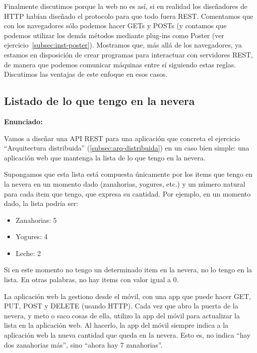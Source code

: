 Finalmente discutimos porque la web no es así, si en realidad los diseñadores de HTTP habían diseñado el protocolo para que todo fuera REST. Comentamos que con los navegadores sólo podemos hacer GETs y POSTs (y contamos que podemos utilizar los demás métodos mediante plug-ins como Poster (ver ejercicio~\ref{subsec:inst-poster}). Mostramos que, más allá de los navegadores, ya estamos en disposición de crear programas para interactuar con servidores REST, de manera que podemos comunicar máquinas entre sí siguiendo estas reglas. Discutimos las ventajas de este enfoque en esos casos.

\subsection{Listado de lo que tengo en la nevera}
\label{subsec:contenido-nevera}

\textbf{Enunciado:}

Vamos a diseñar una API REST para una aplicación que concreta el ejercicio ``Arquitectura distribuida'' (\ref{subsec:arq-distribuida}) en un caso bien simple: una aplicación web que mantenga la lista de lo que tengo en la nevera.

Supongamos que esta lista está compuesta únicamente por los items que tengo en la nevera en un momento dado (zanahorias, yogures, etc.) y un número natural para cada item que tengo, que expresa su cantidad. Por ejemplo, en un momento dado, la lista podría ser:

\begin{itemize}
\item Zanahorias: 5
\item Yogures: 4
\item Leche: 2
\end{itemize}

Si en este momento no tengo un determinado item en la nevera, no lo tengo en la lista. En otras palabras, no hay items con valor igual a 0.

La aplicación web la gestiono desde el móvil, con una app que puede hacer GET, PUT, POST y DELETE (usando HTTP). Cada vez que abro la puerta de la nevera, y meto o saco cosas de ella, utilizo la app del móvil para actualizar la lista en la aplicación web. Al hacerlo, la app del móvil siempre indica a la aplicación web la nueva cantidad que queda en la nevera. Esto es, no indica ``hay dos zanahorias más'', sino ``ahora hay 7 zanahorias''.

